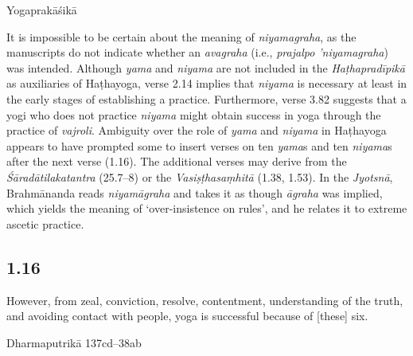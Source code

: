 \begin{ekdosis}
\begin{testimonia}[hp01_015]
Yogaprakāśikā

\begin{versinnote}
\end{versinnote}

\end{testimonia}

\begin{philcomm}[hp01_015]        
It is impossible to be certain about the meaning of \emph{niyamagraha}, as the manuscripts do not indicate whether an \emph{avagraha} (i.e., \emph{prajalpo ’niyamagraha}) was intended. Although \emph{yama} and \emph{niyama} are not included in the \emph{Haṭhapradīpikā} as auxiliaries of Haṭhayoga, verse 2.14 implies that \emph{niyama} is necessary at least in the early stages of establishing a practice. Furthermore, verse 3.82 suggests that a yogi who does not practice \emph{niyama} might obtain success in yoga through the practice of \textit{vajroli}. Ambiguity over the role of \emph{yama} and \emph{niyama} in Haṭhayoga appears to have prompted some to insert verses on ten \emph{yama}s and ten \emph{niyama}s after the next verse (1.16). The additional verses may derive from the \emph{Śāradātilakatantra} (25.7–8) or the  \emph{Vasiṣṭhasaṃhitā} (1.38, 1.53). In the \emph{Jyotsnā}, Brahmānanda reads \emph{niyamāgraha} and takes it as though \emph{āgraha} was implied, which yields the meaning of ‘over-insistence on rules’, and he relates it to extreme ascetic practice.
\end{philcomm}

\subsection*{1.16}
\begin{translation}[hp01_016]
However, from zeal, conviction, resolve, contentment, understanding of the truth, and avoiding contact with people, yoga is successful because of [these] six.
\end{translation}

\begin{sources}[hp01_016]
Dharmaputrikā 137cd–38ab%

\begin{versinnote}
\end{versinnote}


\end{sources}
\end{ekdosis}
